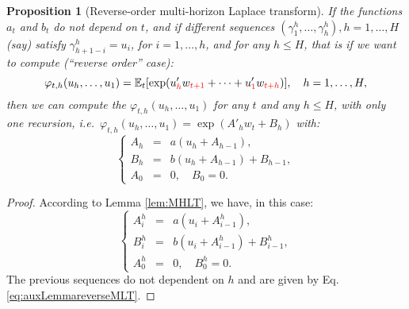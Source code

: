 \documentclass[
  12pt,
]{book}
\newtheorem{proposition}{Proposition}[chapter]
\theoremstyle{definition}
\theoremstyle{definition}
\theoremstyle{definition}
\theoremstyle{definition}
\theoremstyle{remark}
\begin{document}
\begin{proposition}[Reverse-order multi-horizon Laplace transform]
\protect\hypertarget{prp:reverseMLT}{}\label{prp:reverseMLT}If the functions \(a_{t}\) and \(b_{t}\) do not depend on \(t\), and if different sequences \((\gamma^h_1,\dots,\gamma^h_h), h=1,\dots,H\) (say) satisfy \(\gamma^h_{h+1-i} = u_i\), for
\(i=1,\dots,h\), and for any \(h \leq H\), that is if we want to compute (``reverse order'' case):
\[
\varphi_{t,h}(u_h,\dots,u_1)=\mathbb{E}_t[\exp(u'_{{\color{red}h}} w_{{\color{red}t+1}}+\dots+u'_{{\color{red}1}} w_{{\color{red}t+h}})],
\quad h=1,\dots,H,
\]
then we can compute the \(\varphi_{t,h}(u_h,\dots,u_1)\) for any \(t\) and any \(h \leq H\), with only one recursion, i.e.~\(\varphi_{t,h}(u_h,\dots,u_1)=\exp(A'_hw_t+B_h)\) with:
\begin{equation}
\left\{
\begin{array}{ccl}
A_{h} &=& a(u_{h} + A_{h-1}), \\
B_{h} &=& b(u_{h} + A_{h-1}) + B_{h-1}, \\
A_{0} &=& 0,\quad  B_{0} = 0.
\end{array}
\right.\label{eq:auxLemmareverseMLT}
\end{equation}
\end{proposition}

\begin{proof}
According to Lemma \ref{lem:MHLT}, we have, in this case:
\[
\left\{
\begin{array}{ccl}
A^h_{i} &=& a(u_{i} + A^h_{i-1}), \\
B^h_{i} &=& b(u_{i} + A^h_{i-1}) + B^h_{i-1}, \\
A^h_{0} &=& 0, \quad B^h_{0} = 0.
\end{array}
\right.
\]
The previous sequences do not dependent on \(h\) and are given by Eq. \eqref{eq:auxLemmareverseMLT}.
\end{proof}
\end{document}
